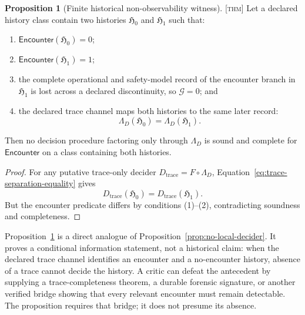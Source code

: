 \documentclass[11pt]{article}
\newcommand{\Thm}{\textsc{[thm]}}
\theoremstyle{definition}
\newtheorem{sproposition}{Proposition}
\begin{document}
\begin{sproposition}[Finite historical non-observability witness]
\label{prop:historical-nonobservability}
\Thm{} Let a declared history class contain two histories
$\mathfrak H_0$ and $\mathfrak H_1$ such that:
\begin{enumerate}
\item $\mathsf{Encounter}(\mathfrak H_0)=0$;
\item $\mathsf{Encounter}(\mathfrak H_1)=1$;
\item the complete operational and safety-model record of the encounter branch
in $\mathfrak H_1$ is lost across a declared discontinuity, so $\mathcal G=0$;
and
\item the declared trace channel maps both histories to the same later record:
\begin{equation}
\Lambda_D(\mathfrak H_0)=\Lambda_D(\mathfrak H_1).
\label{eq:trace-separation-equality}
\end{equation}
\end{enumerate}
Then no decision procedure factoring only through $\Lambda_D$ is sound and
complete for $\mathsf{Encounter}$ on a class containing both histories.
\end{sproposition}

\begin{proof}
For any putative trace-only decider
$D_{\mathrm{trace}}=F\circ\Lambda_D$,
Equation~\eqref{eq:trace-separation-equality} gives
\begin{equation}
D_{\mathrm{trace}}(\mathfrak H_0)=D_{\mathrm{trace}}(\mathfrak H_1).
\end{equation}
But the encounter predicate differs by conditions (1)--(2), contradicting
soundness and completeness.
\end{proof}

Proposition~\ref{prop:historical-nonobservability} is a direct analogue of
Proposition~\ref{prop:no-local-decider}. It proves a conditional information
statement, not a historical claim: when the declared trace channel identifies an
encounter and a no-encounter history, absence of a trace cannot decide the history.
A critic can defeat the antecedent by supplying a trace-completeness theorem,
a durable forensic signature, or another verified bridge showing that every
relevant encounter must remain detectable. The proposition requires that bridge;
it does not presume its absence.
\end{document}
